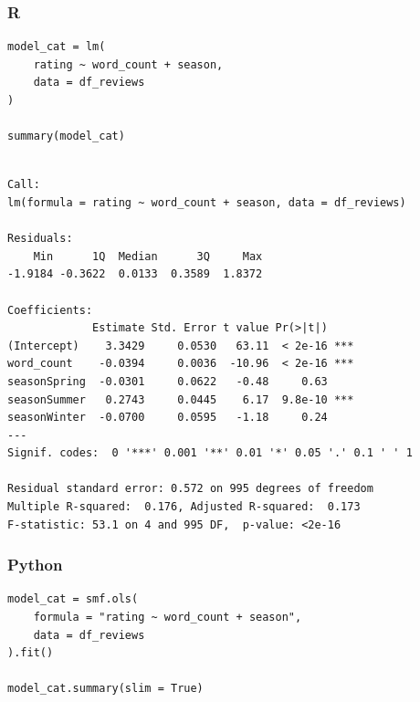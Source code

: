 \documentclass[
  letterpaper,
]{krantz}
\begin{document}
\subsubsection{R}

\begin{verbatim}
model_cat = lm(
    rating ~ word_count + season,
    data = df_reviews
)

summary(model_cat)
\end{verbatim}

\begin{verbatim}

Call:
lm(formula = rating ~ word_count + season, data = df_reviews)

Residuals:
    Min      1Q  Median      3Q     Max 
-1.9184 -0.3622  0.0133  0.3589  1.8372 

Coefficients:
             Estimate Std. Error t value Pr(>|t|)    
(Intercept)    3.3429     0.0530   63.11  < 2e-16 ***
word_count    -0.0394     0.0036  -10.96  < 2e-16 ***
seasonSpring  -0.0301     0.0622   -0.48     0.63    
seasonSummer   0.2743     0.0445    6.17  9.8e-10 ***
seasonWinter  -0.0700     0.0595   -1.18     0.24    
---
Signif. codes:  0 '***' 0.001 '**' 0.01 '*' 0.05 '.' 0.1 ' ' 1

Residual standard error: 0.572 on 995 degrees of freedom
Multiple R-squared:  0.176, Adjusted R-squared:  0.173 
F-statistic: 53.1 on 4 and 995 DF,  p-value: <2e-16
\end{verbatim}

\subsubsection{Python}

\begin{verbatim}
model_cat = smf.ols(
    formula = "rating ~ word_count + season",
    data = df_reviews
).fit()

model_cat.summary(slim = True)
\end{verbatim}
\end{document}
